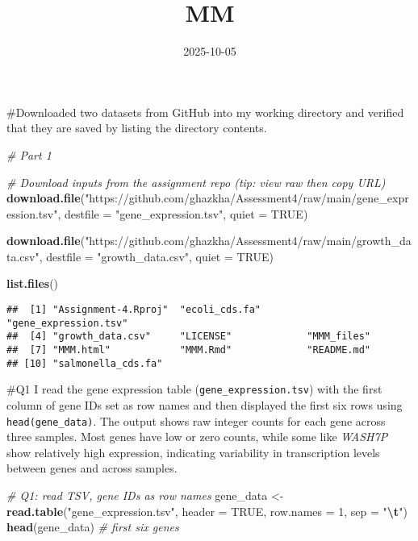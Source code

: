\documentclass[
]{article}
\title{MM}
\author{}
\date{\vspace{-2.5em}2025-10-05}
\newenvironment{Shaded}{\begin{snugshade}}{\end{snugshade}}
\newcommand{\AttributeTok}[1]{\textcolor[rgb]{0.13,0.29,0.53}{#1}}
\newcommand{\CommentTok}[1]{\textcolor[rgb]{0.56,0.35,0.01}{\textit{#1}}}
\newcommand{\ConstantTok}[1]{\textcolor[rgb]{0.56,0.35,0.01}{#1}}
\newcommand{\DecValTok}[1]{\textcolor[rgb]{0.00,0.00,0.81}{#1}}
\newcommand{\FunctionTok}[1]{\textcolor[rgb]{0.13,0.29,0.53}{\textbf{#1}}}
\newcommand{\NormalTok}[1]{#1}
\newcommand{\OtherTok}[1]{\textcolor[rgb]{0.56,0.35,0.01}{#1}}
\newcommand{\SpecialCharTok}[1]{\textcolor[rgb]{0.81,0.36,0.00}{\textbf{#1}}}
\newcommand{\StringTok}[1]{\textcolor[rgb]{0.31,0.60,0.02}{#1}}
\begin{document}
\maketitle

\#Downloaded two datasets from GitHub into my working directory and
verified that they are saved by listing the directory contents.

\begin{Shaded}
\begin{Highlighting}[]
\CommentTok{\# Part 1}

\CommentTok{\# Download inputs from the assignment repo (tip: \textquotesingle{}view raw\textquotesingle{} then copy URL) }
\FunctionTok{download.file}\NormalTok{(}\StringTok{"https://github.com/ghazkha/Assessment4/raw/main/gene\_expression.tsv"}\NormalTok{,}
              \AttributeTok{destfile =} \StringTok{"gene\_expression.tsv"}\NormalTok{, }\AttributeTok{quiet =} \ConstantTok{TRUE}\NormalTok{)}

\FunctionTok{download.file}\NormalTok{(}\StringTok{"https://github.com/ghazkha/Assessment4/raw/main/growth\_data.csv"}\NormalTok{,}
              \AttributeTok{destfile =} \StringTok{"growth\_data.csv"}\NormalTok{, }\AttributeTok{quiet =} \ConstantTok{TRUE}\NormalTok{)}

\FunctionTok{list.files}\NormalTok{()}
\end{Highlighting}
\end{Shaded}

\begin{verbatim}
##  [1] "Assignment-4.Rproj"  "ecoli_cds.fa"        "gene_expression.tsv"
##  [4] "growth_data.csv"     "LICENSE"             "MMM_files"          
##  [7] "MMM.html"            "MMM.Rmd"             "README.md"          
## [10] "salmonella_cds.fa"
\end{verbatim}

\#Q1 I read the gene expression table (\texttt{gene\_expression.tsv})
with the first column of gene IDs set as row names and then displayed
the first six rows using \texttt{head(gene\_data)}. The output shows raw
integer counts for each gene across three samples. Most genes have low
or zero counts, while some like \emph{WASH7P} show relatively high
expression, indicating variability in transcription levels between genes
and across samples.

\begin{Shaded}
\begin{Highlighting}[]
\CommentTok{\# Q1: read TSV, gene IDs as row names}
\NormalTok{gene\_data }\OtherTok{\textless{}{-}} \FunctionTok{read.table}\NormalTok{(}\StringTok{"gene\_expression.tsv"}\NormalTok{,}
                        \AttributeTok{header =} \ConstantTok{TRUE}\NormalTok{,}
                        \AttributeTok{row.names =} \DecValTok{1}\NormalTok{,}
                        \AttributeTok{sep =} \StringTok{"}\SpecialCharTok{\textbackslash{}t}\StringTok{"}\NormalTok{)}
\FunctionTok{head}\NormalTok{(gene\_data)  }\CommentTok{\# first six genes}
\end{Highlighting}
\end{Shaded}
\end{document}
